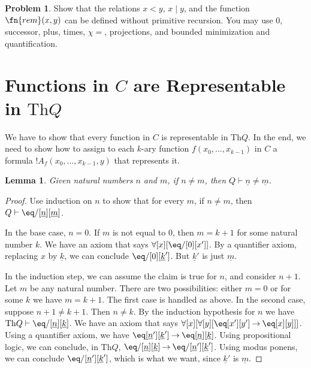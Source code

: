 \documentclass[10pt,a4paper]{article}
\theoremstyle{plain}
\newtheorem{lem}[thm]{Lemma}
\theoremstyle{definition}
\newtheorem{prob}{Problem}[section]
\theoremstyle{remark}
\newcommand*{\olfileid}[3]{}
\newcommand*{\olsection}[1]{\section*{#1}}
\providecommand{\lif}{\mathbin{\rightarrow}}
\providecommand{\lforall}{\mathord{\forall}}
\providecommand{\Proves}{\mathrel{\vdash}}
\providecommand{\Th}{\ensuremath{\mathrm{Th}}}
\providecommand{\num}[1]{\underline{#1}}
\providecommand{\Char}{\chi}
\begin{document}
\begin{prob}
  Show that the relations $x < y$, $x \mid y$, and the
  function~$\fn{rem}(x,y)$ can be defined without primitive recursion.
  You may use $0$, successor, plus, times, $\Char{=}$, projections,
  and bounded minimization and quantification.
\end{prob}





\olfileid{inc}{req}{cre}
\olsection{Functions in $C$ are Representable in $\Th{Q}$}

We have to show that every function in $C$ is representable in
$\Th{Q}$. In the end, we need to show how to assign to each $k$-ary
function $f(x_0,\dots,x_{k-1})$ in $C$ a formula
$!A_f(x_0,\dots,x_{k-1},y)$ that represents it.

\begin{lem}
Given natural numbers $n$ and $m$, if $n \neq m$, then $Q \Proves \num
n \neq \num m$.
\end{lem}

\begin{proof}
Use induction on $n$ to show that for every $m$, if $n \neq m$, then
$Q \Proves \eq/[\num n][\num m]$.

In the base case, $n = 0$. If $m$ is not equal to $0$, then $m = k +
1$ for some natural number $k$. We have an axiom that says
$\lforall[x][\eq/[0][x']]$. By a quantifier axiom, replacing $x$ by
  $\num k$, we can conclude $\eq/[0][\num k']$. But $\num k'$ is just
  $\num m$.

In the induction step, we can assume the claim is true for $n$, and
consider $n+1$. Let $m$ be any natural number. There are two
possibilities: either $m = 0$ or for some $k$ we have $m = k+1$. The
first case is handled as above. In the second case, suppose $n+1 \neq
k+1$. Then $n \neq k$. By the induction hypothesis for $n$ we have
$\Th{Q} \Proves \eq/[\num n][\num k]$. We have an axiom that says
$\lforall[x][\lforall[y][\eq[x'][y'] \lif \eq[x][y]]]$. Using a
quantifier axiom, we have $\eq[\num n'][\num k'] \lif \eq[\num n][\num
  k]$. Using propositional logic, we can conclude, in $\Th{Q}$,
$\eq/[\num n][\num k] \lif \eq/[\num n'][\num k']$. Using modus
ponens, we can conclude $\eq/[\num n'][\num k']$, which is what we want,
since $\num k'$ is $\num m$.
\end{proof}
\end{document}
